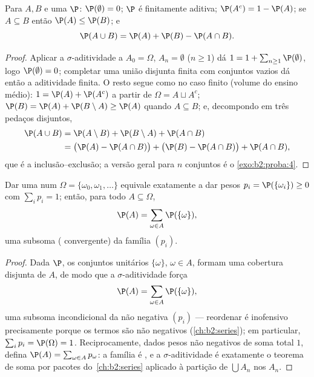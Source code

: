 \begin{proposition}\label{prop:b2:proba:rules}
Para  $A, B$ e uma  $\P$:
$\P(\emptyset) = 0$; $\P$ é finitamente aditiva; $\P(A^c) = 1 -
\P(A)$; se $A \subseteq B$ então $\P(A) \leq \P(B)$; e
\[
\P(A \cup B) = \P(A) + \P(B) - \P(A \cap B) .
\]
\end{proposition}

\begin{proof}
Aplicar a $\sigma$-aditividade a $A_0 = \Omega$, $A_n = \emptyset$
($n \geq 1$) dá $1 = 1 + \sum_{n\geq1}\P(\emptyset)$, logo
$\P(\emptyset) = 0$; completar uma união disjunta finita com conjuntos
vazios dá então a aditividade finita. O resto segue como no
caso finito (volume do ensino médio): $1 = \P(A) + \P(A^c)$ a partir de
$\Omega = A \sqcup A^c$; $\P(B) = \P(A) + \P(B \setminus A)
\geq \P(A)$ quando $A \subseteq B$; e, decompondo em três
pedaços disjuntos,
\begin{align*}
\P(A \cup B) &= \P(A \setminus B) + \P(B \setminus A) +
\P(A \cap B)\\
&= \bigl(\P(A) - \P(A\cap B)\bigr) + \bigl(\P(B) - \P(A\cap
B)\bigr) + \P(A \cap B),
\end{align*}
que é a inclusão--exclusão; a versão geral para $n$ conjuntos é o
\cref{exo:b2:proba:4}.
\end{proof}

\begin{proposition}\label{prop:b2:proba:distribution}
Dar uma  num $\Omega =
\{\omega_0, \omega_1, \dots\}$  equivale exatamente a dar pesos
$p_i = \P(\{\omega_i\}) \geq 0$ com $\sum_i p_i = 1$; então, para
todo $A \subseteq \Omega$,
\[
\P(A) = \sum_{\omega \in A} \P(\{\omega\}) ,
\]
uma subsoma ( convergente) da família $(p_i)$.
\end{proposition}

\begin{proof}
Dada $\P$, os conjuntos unitários $\{\omega\}$, $\omega \in A$, formam uma
cobertura disjunta  de $A$, de modo que a $\sigma$-aditividade força
\[
\P(A) = \sum_{\omega\in A}\P(\{\omega\}),
\]
uma subsoma incondicional da  não negativa
$(p_i)$ --- reordenar é inofensivo precisamente porque os
termos são não negativos (\cref{ch:b2:series}); em particular,
$\sum_ip_i = \P(\Omega) = 1$.
Reciprocamente, dados pesos não negativos de soma total $1$, defina
$\P(A) = \sum_{\omega \in A}p_\omega$: a família é , e a
$\sigma$-aditividade é exatamente o teorema de soma por pacotes
do~\cref{ch:b2:series} aplicado à partição de $\bigcup A_n$
nos $A_n$.
\end{proof}

